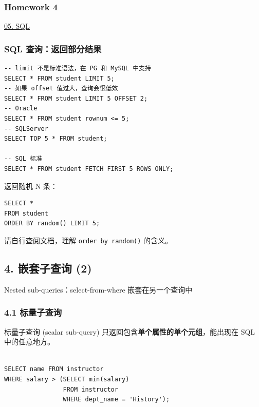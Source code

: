\documentclass[aspectratio=169, 14pt]{beamer}
\begin{document}
\begin{frame}
	\frametitle{Homework 4}
	\href{https://github.com/ChenZhongPu/db-swufe/tree/master/05_sql}{05. SQL}

\end{frame}

\begin{frame}[fragile]
	\frametitle{SQL 查询：返回部分结果}

	\begin{verbatim}
-- limit 不是标准语法，在 PG 和 MySQL 中支持
SELECT * FROM student LIMIT 5;
-- 如果 offset 值过大，查询会很低效
SELECT * FROM student LIMIT 5 OFFSET 2;
-- Oracle
SELECT * FROM student rownum <= 5;
-- SQLServer
SELECT TOP 5 * FROM student;

-- SQL 标准
SELECT * FROM student FETCH FIRST 5 ROWS ONLY;
    \end{verbatim}

\end{frame}

\begin{frame}[fragile]
	返回随机 N 条：

	\begin{verbatim}
SELECT * 
FROM student 
ORDER BY random() LIMIT 5; 
\end{verbatim}

	请自行查阅文档，理解 \texttt{order by random()} 的含义。

\end{frame}

\begin{frame}
	\section{\textcolor{darkmidnightblue}{4. 嵌套子查询 (2)}}
	Nested sub-queries：\alert{select-from-where} 嵌套在另一个查询中

\end{frame}

\begin{frame}[fragile]
	\frametitle{4.1 标量子查询}
	标量子查询 (scalar sub-query) 只返回包含\textbf{单个属性的单个元组}，能出现在 SQL 中的任意地方。

	\begin{verbatim}

SELECT name FROM instructor
WHERE salary > (SELECT min(salary)
                FROM instructor
                WHERE dept_name = 'History');
\end{verbatim}

\end{frame}
\end{document}
